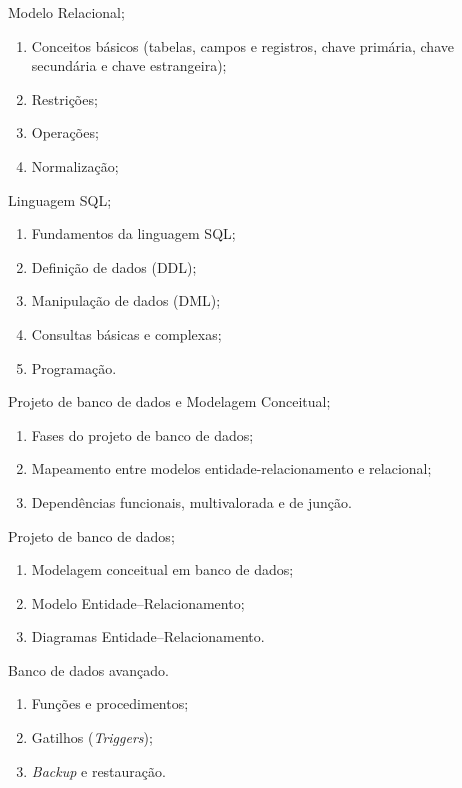 \begin{pud}
\begin{description}[itemsep=0em]
        \item[UNIDADE II:] Modelo Relacional;
	         \begin{enumerate}[itemsep=0em, topsep=0em]
                \item  Conceitos básicos (tabelas, campos e registros, chave primária, chave secundária e chave estrangeira);
				\item Restrições;
				\item Operações;
				\item  Normalização;
            \end{enumerate}
            
         \item[UNIDADE III:] Linguagem SQL;
	         \begin{enumerate}[itemsep=0em, topsep=0em]
				\item  Fundamentos da linguagem SQL;
				\item Definição de dados (DDL);
				\item Manipulação de dados (DML);
				\item  Consultas básicas e complexas;
				\item Programação.        
            \end{enumerate}
            
         \item[UNIDADE IV:]  Projeto de banco de dados  e Modelagem Conceitual;
	         \begin{enumerate}[itemsep=0em, topsep=0em]
				\item Fases do projeto de banco de dados;
				\item Mapeamento entre modelos entidade-relacionamento e relacional;
				\item Dependências funcionais, multivalorada e de junção.
            \end{enumerate}

         \item[UNIDADE V:] Projeto de banco de dados; 
	         \begin{enumerate}[itemsep=0em, topsep=0em]
				\item Modelagem conceitual em banco de dados;
				\item Modelo Entidade--Relacionamento;
				\item Diagramas Entidade--Relacionamento.      
            \end{enumerate}
            
         \item[UNIDADE VI:]  Banco de dados avançado.
	         \begin{enumerate}[itemsep=0em, topsep=0em]
				\item Funções e procedimentos;
				\item  Gatilhos (\textit{Triggers});
				\item \textit{Backup} e restauração.  
            \end{enumerate}
	\end{description}		
	

\end{pud}
